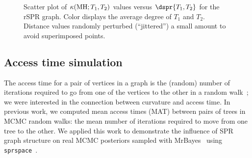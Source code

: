 \documentclass[11pt]{amsart}
\let\MYoriglatexcaption\caption
\renewcommand{\caption}[2][\relax]{\MYoriglatexcaption[#2]{#2}}
\newcommand{\MH}{\operatorname{MH}}
\newcommand{\curvature}[2][]{%
    \ifthenelse{\equal{#1}{}}%
		{\kappa(#2)}%
		{\kappa_{#1}(#2)}%
}
\begin{document}
\begin{figure}
    \caption{Scatter plot of $\curvature{\MH; T_1,T_2}$ values versus $\dspr{T_1,T_2}$ for the rSPR graph. Color displays the average degree of $T_1$ and $T_2$. Distance values randomly perturbed (``jittered'') a small amount to avoid superimposed points.}
	\label{fig:rspr-scatter}
\end{figure}

\subsection{Access time simulation}
The access time for a pair of vertices in a graph is the (random) number of iterations required to go from one of the vertices to the other in a random walk~\cite{lovasz1993random}; we were interested in the connection between curvature and access time.
In previous work, we computed mean access times (MAT) between pairs of trees in  MCMC random walks: the mean number of iterations required to move from one tree to the other.
We applied this work to demonstrate the influence of SPR graph structure on real MCMC posteriors sampled with MrBayes~\cite{Whidden2015-yi} using \texttt{sprspace}~\cite{sprspace}.
\end{document}
